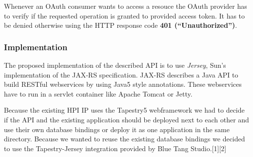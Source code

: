 Whenever an OAuth consumer wants to access a resouce the OAuth
provider has to verify if the requested operation is granted to
provided access token. It has to be denied otherwise using the HTTP
response code \textbf{401 (``Unauthorized'')}.

\subsubsection{Implementation}

The proposed implementation of the described API is to use
\emph{Jersey}, Sun's implementation of the JAX-RS specification.
JAX-RS describes a Java API to build RESTful webservices by using
Java5 style annotations. These webservices have to run in a servlet
container like Apache Tomcat or Jetty.

Because the existing HPI IP uses the Tapestry5 webframework we had
to decide if the API and the existing application should be
deployed next to each other and use their own database bindings or
deploy it as one application in the same directory. Because we
wanted to reuse the existing database bindings we decided to use
the Tapestry-Jersey integration provided by Blue Tang
Studio.[1][2]
